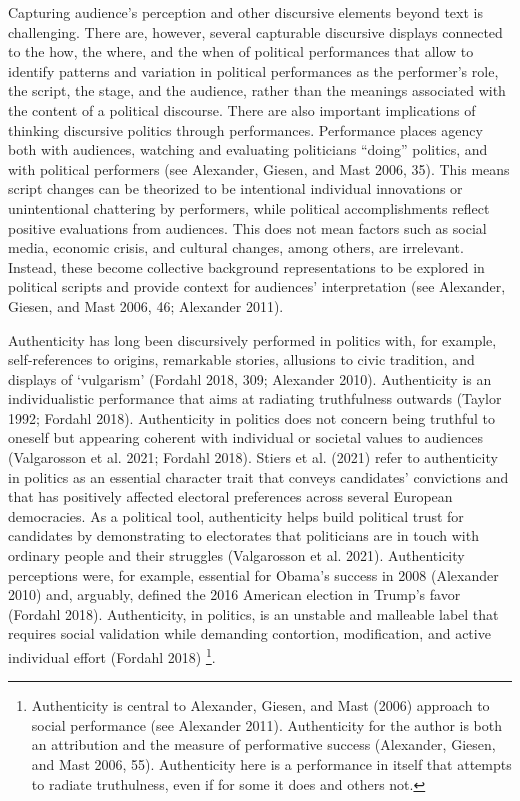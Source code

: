 \documentclass[smallextended]{svjour3}       %
\begin{document}
Capturing audience's perception and other discursive elements beyond
text is challenging. There are, however, several capturable discursive
displays connected to the how, the where, and the when of political
performances that allow to identify patterns and variation in political
performances as the performer's role, the script, the stage, and the
audience, rather than the meanings associated with the content of a
political discourse. There are also important implications of thinking
discursive politics through performances. Performance places agency both
with audiences, watching and evaluating politicians ``doing'' politics,
and with political performers (see Alexander, Giesen, and Mast 2006,
35). This means script changes can be theorized to be intentional
individual innovations or unintentional chattering by performers, while
political accomplishments reflect positive evaluations from audiences.
This does not mean factors such as social media, economic crisis, and
cultural changes, among others, are irrelevant. Instead, these become
collective background representations to be explored in political
scripts and provide context for audiences' interpretation (see
Alexander, Giesen, and Mast 2006, 46; Alexander 2011).

Authenticity has long been discursively performed in politics with, for
example, self-references to origins, remarkable stories, allusions to
civic tradition, and displays of `vulgarism' (Fordahl 2018, 309;
Alexander 2010). Authenticity is an individualistic performance that
aims at radiating truthfulness outwards (Taylor 1992; Fordahl 2018).
Authenticity in politics does not concern being truthful to oneself but
appearing coherent with individual or societal values to audiences
(Valgarosson et al. 2021; Fordahl 2018). Stiers et al. (2021) refer to
authenticity in politics as an essential character trait that conveys
candidates' convictions and that has positively affected electoral
preferences across several European democracies. As a political tool,
authenticity helps build political trust for candidates by demonstrating
to electorates that politicians are in touch with ordinary people and
their struggles (Valgarosson et al. 2021). Authenticity perceptions
were, for example, essential for Obama's success in 2008 (Alexander
2010) and, arguably, defined the 2016 American election in Trump's favor
(Fordahl 2018). Authenticity, in politics, is an unstable and malleable
label that requires social validation while demanding contortion,
modification, and active individual effort (Fordahl 2018) \footnote{
  Authenticity is central to Alexander, Giesen, and Mast (2006) approach
  to social performance (see Alexander 2011). Authenticity for the
  author is both an attribution and the measure of performative success
  (Alexander, Giesen, and Mast 2006, 55). Authenticity here is a
  performance in itself that attempts to radiate truthulness, even if
  for some it does and others not.}.
\end{document}
